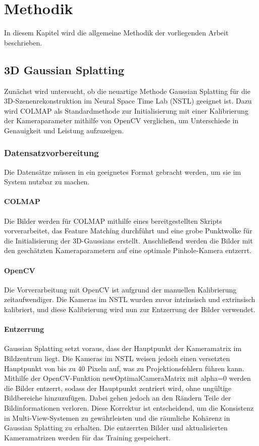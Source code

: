
\chapter{Methodik}

In diesem Kapitel wird die allgemeine Methodik der vorliegenden Arbeit beschrieben.

\section{3D Gaussian Splatting}

Zunächst wird untersucht, ob die neuartige Methode Gaussian Splatting für die 3D-Szenenrekonstruktion im Neural Space Time Lab (NSTL) geeignet ist.
Dazu wird COLMAP als Standardmethode zur Initialisierung mit einer Kalibrierung der Kameraparameter mithilfe von OpenCV verglichen, um Unterschiede in Genauigkeit und Leistung aufzuzeigen.

\subsection{Datensatzvorbereitung}
\label{sec:Datensatzvorbereitung}
Die Datensätze müssen in ein geeignetes Format gebracht werden, um sie im System nutzbar zu machen.

\subsubsection{COLMAP}

Die Bilder werden für COLMAP mithilfe eines bereitgestellten Skripts vorverarbeitet, das Feature Matching durchführt und eine grobe Punktwolke für die Initialisierung der 3D-Gaussians erstellt. 
Anschließend werden die Bilder mit den geschätzten Kameraparametern auf eine optimale Pinhole-Kamera entzerrt.

\subsubsection{OpenCV}
Die Vorverarbeitung mit OpenCV ist aufgrund der manuellen Kalibrierung zeitaufwendiger. 
Die Kameras im NSTL wurden zuvor intrinsisch und extrinsisch kalibriert, und diese Kalibrierung wird nun zur Entzerrung der Bilder verwendet.

\subsubsection{Entzerrung}
Gaussian Splatting setzt voraus, dass der Hauptpunkt der Kameramatrix im Bildzentrum liegt. Die Kameras im NSTL weisen jedoch einen versetzten Hauptpunkt von bis zu 40 Pixeln auf, was zu Projektionsfehlern führen kann. Mithilfe der OpenCV-Funktion newOptimalCameraMatrix mit alpha=0 werden die Bilder entzerrt, sodass der Hauptpunkt zentriert wird, ohne ungültige Bildbereiche hinzuzufügen. Dabei gehen jedoch an den Rändern Teile der Bildinformationen verloren. Diese Korrektur ist entscheidend, um die Konsistenz in Multi-View-Systemen zu gewährleisten und die räumliche Kohärenz in Gaussian Splatting zu erhalten. Die entzerrten Bilder und aktualisierten Kameramatrizen werden für das Training gespeichert.

